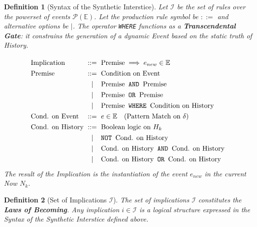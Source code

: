 \documentclass[11pt, a4paper]{article}
\theoremstyle{formalism}
\newtheorem{formalism}{Definition}
\begin{document}
\begin{formalism}[Syntax of the Synthetic Interstice]

Let $\mathcal{I}$ be the set of rules over the powerset of events
$\mathcal{P}(\mathbb{E})$. Let the production rule symbol be $::=$ and
alternative options be $\mid$. The operator \texttt{WHERE} functions as a
\textbf{Transcendental Gate}: it constrains the generation of a dynamic
Event based on the static truth of History.

\begin{displaymath}
\renewcommand{\arraystretch}{1.3} 
\setlength{\arraycolsep}{3pt}     
\begin{array}{l c l}              
    \text{Implication} & ::= & \text{Premise} \implies e_{new} \in \mathbb{E} \\
    
    \text{Premise}     & ::= & \text{Condition on Event} \\
                       & \mid & \text{Premise} \textnormal{\texttt{ AND }} \text{Premise} \\
                       & \mid & \text{Premise} \textnormal{\texttt{ OR }} \text{Premise} \\
                       & \mid & \text{Premise} \textnormal{\texttt{ WHERE }} \text{Condition on History} \\
                       
    \text{Cond. on Event}   & ::= & e \in \mathbb{E} \quad (\text{Pattern Match on } \delta) \\
    
    \text{Cond. on History} & ::= & \text{Boolean logic on } H_k \\
                                & \mid & \textnormal{\texttt{NOT }} \text{Cond. on History} \\
                                & \mid & \text{Cond. on History} \textnormal{\texttt{ AND }} \text{Cond. on History} \\
                                & \mid & \text{Cond. on History} \textnormal{\texttt{ OR }} \text{Cond. on History} \\
\end{array}
\end{displaymath}
    The result of the \textit{Implication} is the instantiation of the event $e_{new}$ in the current Now $N_k$.
\end{formalism}

\begin{formalism}[Set of Implications $\mathcal{I}$]
    The set of implications $\mathcal{I}$ constitutes the \textbf{Laws of Becoming}.
    Any implication $i \in \mathcal{I}$ is a logical structure expressed in the 
    \textit{Syntax of the Synthetic Interstice} defined above.
\end{formalism}
\end{document}
